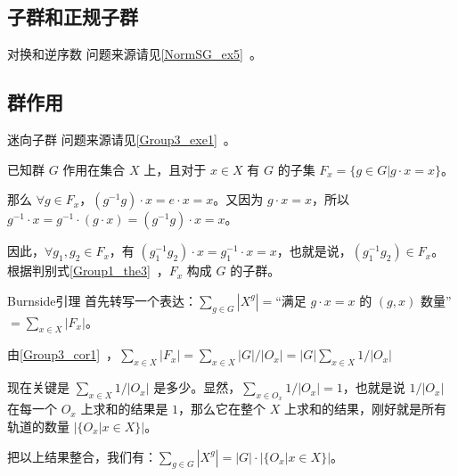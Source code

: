 
\subsection{子群和正规子群}

\begin{example}{对换和逆序数}\label{GroupP_ex1}
问题来源请见\autoref{NormSG_ex5}~。



\end{example}

\subsection{群作用}

\begin{example}{迷向子群}\label{GroupP_ex2}
问题来源请见\autoref{Group3_exe1}~。

已知群 $G$ 作用在集合 $X$ 上，且对于 $x\in X$ 有 $G$ 的子集 $F_x=\{g\in G|g\cdot x=x\}$。

那么 $\forall g\in F_x$，$(g^{-1}g)\cdot x=e\cdot x=x$。又因为 $g\cdot x=x$，所以 $g^{-1}\cdot x=g^{-1}\cdot(g\cdot x)=(g^{-1}g)\cdot x=x$。

因此，$\forall g_1, g_2\in F_x$，有 $(g_1^{-1}g_2)\cdot x=g_1^{-1}\cdot x=x$，也就是说，$(g_1^{-1}g_2)\in F_x$。根据判别式\autoref{Group1_the3}~，$F_x$ 构成 $G$ 的子群。




\end{example}

\begin{example}{Burnside引理}\label{GroupP_ex3}
首先转写一个表达：$\sum_{g\in G}|X^g|=$“满足 $g\cdot x=x$ 的 $(g, x)$ 数量”$=\sum_{x\in X}|F_x|$。

由\autoref{Group3_cor1}~，$\sum_{x\in X}|F_x|=\sum_{x\in X} |G|/|O_x|=|G| \sum_{x\in X} 1/|O_x|$

现在关键是 $\sum_{x\in X} 1/|O_x|$ 是多少。显然，$\sum_{x\in O_x} 1/|O_x|=1$，也就是说 $1/|O_x|$ 在每一个 $O_x$ 上求和的结果是 $1$，那么它在整个 $X$ 上求和的结果，刚好就是所有轨道的数量 $|\{O_x|x\in X\}|$。

把以上结果整合，我们有：$\sum_{g\in G}|X^g|=|G|\cdot|\{O_x|x\in X\}|$。
\end{example}

